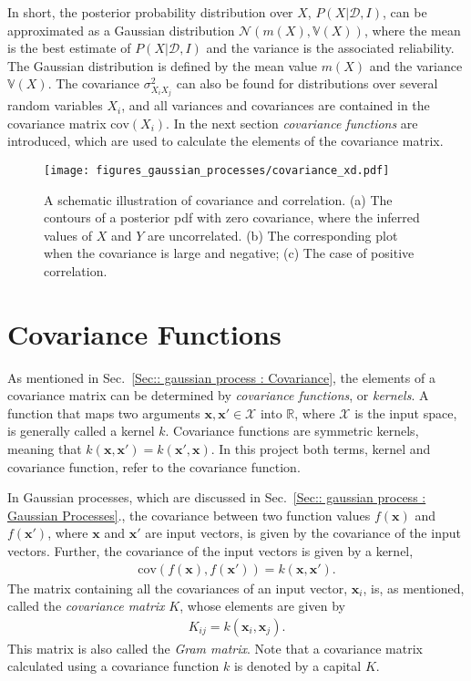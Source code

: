 \documentclass[twoside,english]{uiofysmaster}
\begin{document}
{In short, the posterior probability distribution over $X$, $P(X | \mathcal{D}, I)$, can be approximated as a Gaussian distribution $\mathcal{N}(m(X), \mathbb{V}(X))$, where the mean is the best estimate of $P(X | \mathcal{D}, I)$ and the variance is the associated reliability. The Gaussian distribution is defined by the mean value $m(X)$ and the variance $\mathbb{V}(X)$. The covariance $\sigma_{X_i X_j}^2$ can also be found for distributions over several random variables $X_i$, and all variances and covariances are contained in the covariance matrix $\text{cov}(X_i)$. In the next section \textit{covariance functions} are introduced, which are used to calculate the elements of the covariance matrix.

\begin{figure}
\centering
\texttt{[image: figures\_gaussian\_processes/covariance\_xd.pdf]}
\caption{A schematic illustration of covariance and correlation. (a) The contours of a posterior pdf with zero covariance, where the inferred values of $X$ and $Y$ are uncorrelated. (b) The corresponding plot when the covariance is large and negative; (c) The case of positive correlation.}
\label{Fig:: gaussian process : Covariance illustrated}
\end{figure}


\section{Covariance Functions}\label{Sec:: gaussian processes : Covariance functions}


As mentioned in Sec.~\ref{Sec:: gaussian process : Covariance}, the elements of a covariance matrix can be determined by \textit{covariance functions}, or \textit{kernels}. A function that maps two arguments $\textbf{x},\textbf{x}' \in \mathcal{X}$ into $\mathbb{R}$, where $\mathcal{X}$ is the input space, is generally called a kernel $k$. Covariance functions are symmetric kernels, meaning that $k(\textbf{x}, \textbf{x}') = k(\textbf{x}', \textbf{x})$. In this project both terms, kernel and covariance function, refer to the covariance function. 

In Gaussian processes, which are discussed in Sec.~\ref{Sec:: gaussian process : Gaussian Processes}., the covariance between two function values $f(\textbf{x})$ and $f(\textbf{x}')$, where $\textbf{x}$ and $\textbf{x}'$ are input vectors, is given by the covariance of the input vectors. Further, the covariance of the input vectors is given by a kernel, 
\begin{align}
\text{cov}(f(\textbf{x}), f(\textbf{x}')) = k(\textbf{x}, \textbf{x}').
\end{align}
The matrix containing all the covariances of an input vector, $\textbf{x}_i$, is, as mentioned, called the \textit{covariance matrix} $K$, whose elements are given by
\begin{align}\label{Eq:: covariance matrix}
K_{ij} = k(\textbf{x}_i, \textbf{x}_j).
\end{align}
This matrix is also called the \textit{Gram matrix}. Note that a covariance matrix calculated using a covariance function $k$ is denoted by a capital $K$.

}
\end{document}
